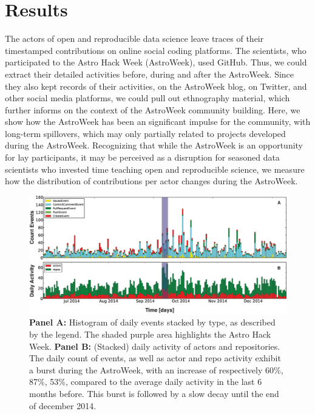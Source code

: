 \section{Results}
The actors of open and reproducible data science leave traces of their timestamped contributions on online social coding platforms. The scientists, who participated to the Astro Hack Week (AstroWeek), used GitHub. Thus, we could extract their detailed activities before, during and after the AstroWeek. Since they also kept records of their activities, on the AstroWeek blog, on Twitter, and other social media platforms, we could pull out ethnography material, which further informs on the context of the AstroWeek community building. Here, we show how the AstroWeek has been an significant impulse for the community, with long-term spillovers, which may only partially related to projects developed during the AstroWeek. Recognizing that while the AstroWeek is an opportunity for lay participants, it may be perceived as a disruption for seasoned data scientists who invested time teaching open and reproducible science, we measure how the distribution of contributions per actor changes during the AstroWeek.


\begin{figure}[!t]
\centering
\includegraphics[width=2.0\columnwidth]{figures/timeline.eps}
\caption{ {\bf Panel A:} Histogram of daily events stacked by type, as described by the legend. The shaded purple area highlights the Astro Hack Week. {\bf Panel B:} (Stacked) daily activity of actors and repositories. The daily count of events, as well as actor and repo activity exhibit a burst during the AstroWeek, with an increase of respectively 60\%, 87\%, 53\%, compared to the average daily activity in the last 6 months before. This burst is followed by a slow decay until the end of december 2014.
}
\label{fig:time_series}
\end{figure}

